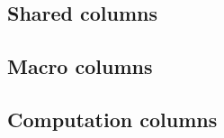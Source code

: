 \subsection{Shared columns}             \label{rlp utils: columns: shared}            
\subsection{Macro columns}              \label{rlp utils: columns: macro}             
\subsection{Computation columns}        \label{rlp utils: columns: computation}       
